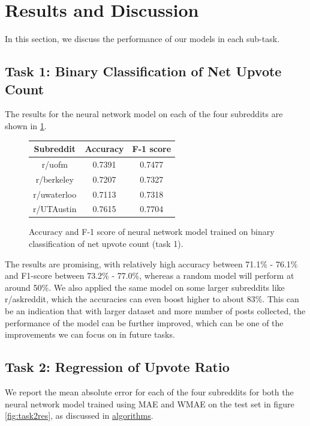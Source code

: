 \documentclass[11pt,a4paper]{article}
\let\Oldsection\section
\renewcommand{\section}{\FloatBarrier\Oldsection}
\let\Oldsubsection\subsection
\renewcommand{\subsection}{\FloatBarrier\Oldsubsection}
\begin{document}
\Oldsection{Results and Discussion}
\label{sec:results}
    In this section, we discuss the performance of our models in each sub-task.

    \Oldsubsection{Task 1: Binary Classification of Net Upvote Count}
    The results for the neural network model on each of the four subreddits are shown in \ref{fig:task1res}.

    \begin{figure}
        \begin{center}
            \begin{tabular}{ |c|c|c|}
                \hline
                Subreddit & Accuracy & F-1 score \\
                \hline
                r/uofm & 0.7391 & 0.7477 \\
                \hline
                r/berkeley & 0.7207 & 0.7327 \\
                \hline
                r/uwaterloo & 0.7113 & 0.7318 \\
                \hline
                r/UTAustin & 0.7615 & 0.7704 \\
                \hline
            \end{tabular}  
        \end{center}

        \caption{Accuracy and F-1 score of neural network model trained on binary classification of net upvote count (task 1).}
        \label{fig:task1res}
    \end{figure}

    The results are promising, with relatively high accuracy between 71.1\% - 76.1\% and F1-score between 73.2\% - 77.0\%, whereas a random model will perform at around 50\%. We also applied the same model on some larger subreddits like r/askreddit, which the accuracies can even boost higher to about 83\%. This can be an indication that with larger dataset and more number of posts collected, the performance of the model can be further improved, which can be one of the improvements we can focus on in future tasks. 
    \Oldsubsection{Task 2: Regression of Upvote Ratio}
    We report the mean absolute error for each of the four subreddits for both the neural network model trained using MAE and WMAE on the test set in figure \ref{fig:task2res}, as discussed in \hyperref[sec:algorithms]{algorithms}.
\end{document}
